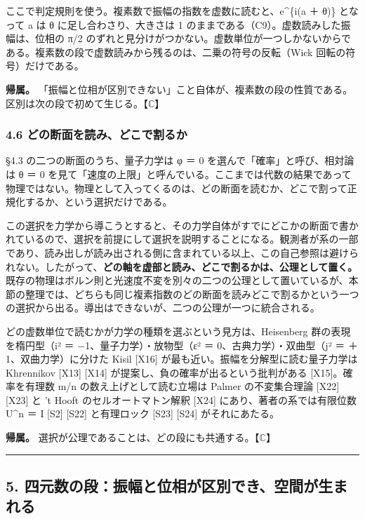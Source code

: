 \documentclass[
  a4paper,
]{ltjsarticle}
\begin{document}
ここで判定規則を使う。複素数で振幅の指数を虚数に読むと、e\^{}\{i(a ＋
θ)\} となって a は θ に足し合わさり、大きさは 1
のままである（C9）。虚数読みした振幅は、位相の π/2
のずれと見分けがつかない。虚数単位が一つしかないからである。複素数の段で虚数読みから残るのは、二乗の符号の反転（Wick
回転の符号）だけである。

\textbf{帰属。}
「振幅と位相が区別できない」こと自体が、複素数の段の性質である。区別は次の段で初めて生じる。【\(\mathbb{C}\)】

\subsubsection{4.6
どの断面を読み、どこで割るか}\label{ux3069ux306eux65adux9762ux3092ux8aadux307fux3069ux3053ux3067ux5272ux308bux304b}

§4.3 の二つの断面のうち、量子力学は φ ＝ 0
を選んで「確率」と呼び、相対論は θ ＝ 0
を見て「速度の上限」と呼んでいる。ここまでは代数の結果であって物理ではない。物理として入ってくるのは、どの断面を読むか、どこで割って正規化するか、という選択だけである。

この選択を力学から導こうとすると、その力学自体がすでにどこかの断面で書かれているので、選択を前提にして選択を説明することになる。観測者が系の一部であり、読み出しが読み出される側に含まれている以上、この自己参照は避けられない。したがって、\textbf{どの軸を虚部と読み、どこで割るかは、公理として置く。}
既存の物理はボルン則と光速度不変を別々の二つの公理として置いているが、本節の整理では、どちらも同じ複素指数のどの断面を読みどこで割るかという一つの選択から出る。導出はできないが、二つの公理が一つに統合される。

どの虚数単位で読むかが力学の種類を選ぶという見方は、Heisenberg
群の表現を楕円型（i² ＝ −1、量子力学）・放物型（ε² ＝
0、古典力学）・双曲型（j² ＝ ＋1、双曲力学）に分けた Kisil {[}X16{]}
が最も近い。振幅を分解型に読む量子力学は Khrennikov {[}X13{]} {[}X14{]}
が提案し、負の確率が出るという批判がある {[}X15{]}。確率を有理数 m/n
の数え上げとして読む立場は Palmer の不変集合理論 {[}X22{]} {[}X23{]} と
't Hooft のセルオートマトン解釈 {[}X24{]} にあり、著者の系では有限位数
U\^{}n ＝ I {[}S2{]} {[}S22{]} と有理ロック {[}S23{]} {[}S24{]}
がそれにあたる。

\textbf{帰属。}
選択が公理であることは、どの段にも共通する。【\(\mathbb{C}\)】

\begin{center}\rule{0.5\linewidth}{0.5pt}\end{center}

\subsection{5.
四元数の段：振幅と位相が区別でき、空間が生まれる}\label{ux56dbux5143ux6570ux306eux6bb5ux632fux5e45ux3068ux4f4dux76f8ux304cux533aux5225ux3067ux304dux7a7aux9593ux304cux751fux307eux308cux308b}
\end{document}
